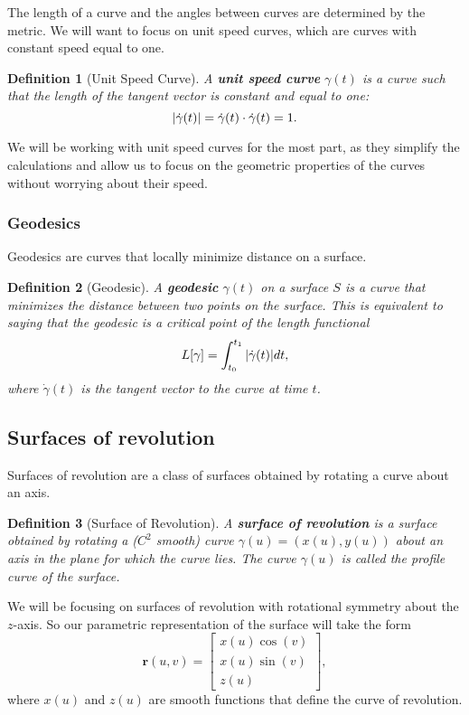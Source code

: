\documentclass[12pt]{article}
\newtheorem{definition}{Definition}[section]
\begin{document}
The length of a curve and the angles between curves are determined by the metric. 
We will want to focus on unit speed curves, which are curves with constant speed equal to one.
\begin{definition}[Unit Speed Curve]
A \textbf{unit speed curve} $\gamma(t)$ is a curve such that the length of the tangent vector is constant and equal to one:
\[
    \abs{\dot{\gamma}(t)} = \dot{\gamma}(t) \cdot \dot{\gamma}(t) = 1.
\]
\end{definition}

We will be working with unit speed curves for the most part, as they simplify the calculations and allow us to focus on the geometric properties of the curves without worrying about their speed.

\subsubsection{Geodesics}
Geodesics are curves that locally minimize distance on a surface.

\begin{definition}[Geodesic]
A \textbf{geodesic} $\gamma(t)$ on a surface $S$ is a curve that minimizes the distance between two points on the surface.
This is equivalent to saying that the geodesic is a critical point of the length functional
\[
    L[\gamma] = \int_{t_0}^{t_1} \abs{\dot{\gamma}(t)} dt,
\]
where $\dot{\gamma}(t)$ is the tangent vector to the curve at time $t$.
\end{definition}

\subsection{Surfaces of revolution}

Surfaces of revolution are a class of surfaces obtained by rotating a curve about an axis.

\begin{definition}[Surface of Revolution]
A \textbf{surface of revolution} is a surface obtained by rotating a ($C^{2}$ smooth) curve \(\gamma(u) = (x(u), y(u))\) about an axis in the plane for which the curve lies.
The curve \(\gamma(u)\) is called the profile curve of the surface.
\end{definition}

We will be focusing on surfaces of revolution with rotational symmetry about the \(z\)-axis.
So our parametric representation of the surface will take the form
$$
    \mathbf{r}(u, v) = \begin{bmatrix} x(u) \cos (v) \\ x(u) \sin (v) \\ z(u) \end{bmatrix},
$$
where \(x(u)\) and \(z(u)\) are smooth functions that define the curve of revolution.
\end{document}
